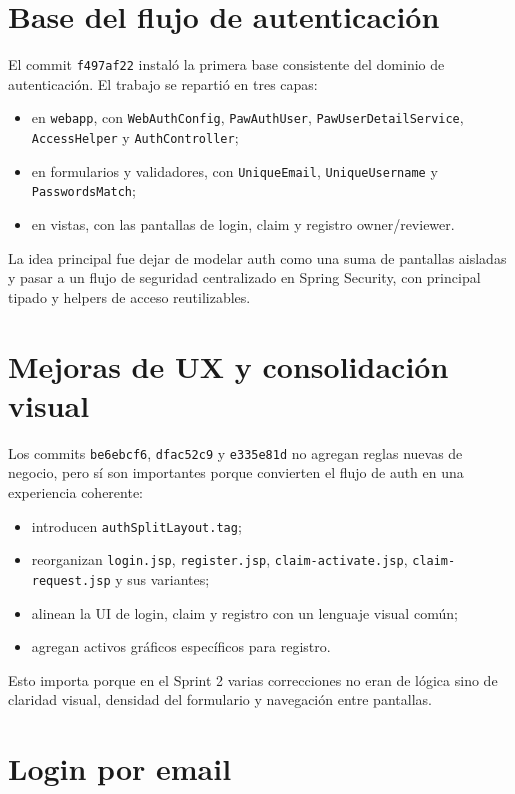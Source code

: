 \documentclass[11pt,a4paper]{report}
\newcommand{\commit}[1]{\texttt{#1}}
\newcommand{\code}[1]{\nolinkurl{#1}}
\begin{document}
\section{Base del flujo de autenticaci\'on}

El commit \commit{f497af22} instal\'o la primera base consistente del dominio de autenticaci\'on. El trabajo se reparti\'o en tres capas:

\begin{itemize}
  \item en \code{webapp}, con \code{WebAuthConfig}, \code{PawAuthUser}, \code{PawUserDetailService}, \code{AccessHelper} y \code{AuthController};
  \item en formularios y validadores, con \code{UniqueEmail}, \code{UniqueUsername} y \code{PasswordsMatch};
  \item en vistas, con las pantallas de login, claim y registro owner/reviewer.
\end{itemize}

La idea principal fue dejar de modelar auth como una suma de pantallas aisladas y pasar a un flujo de seguridad centralizado en Spring Security, con principal tipado y helpers de acceso reutilizables.

\section{Mejoras de UX y consolidaci\'on visual}

Los commits \commit{be6ebcf6}, \commit{dfac52c9} y \commit{e335e81d} no agregan reglas nuevas de negocio, pero s\'i son importantes porque convierten el flujo de auth en una experiencia coherente:

\begin{itemize}
  \item introducen \code{authSplitLayout.tag};
  \item reorganizan \code{login.jsp}, \code{register.jsp}, \code{claim-activate.jsp}, \code{claim-request.jsp} y sus variantes;
  \item alinean la UI de login, claim y registro con un lenguaje visual com\'un;
  \item agregan activos gr\'aficos espec\'ificos para registro.
\end{itemize}

Esto importa porque en el Sprint 2 varias correcciones no eran de l\'ogica sino de claridad visual, densidad del formulario y navegaci\'on entre pantallas.

\section{Login por email}
\end{document}
